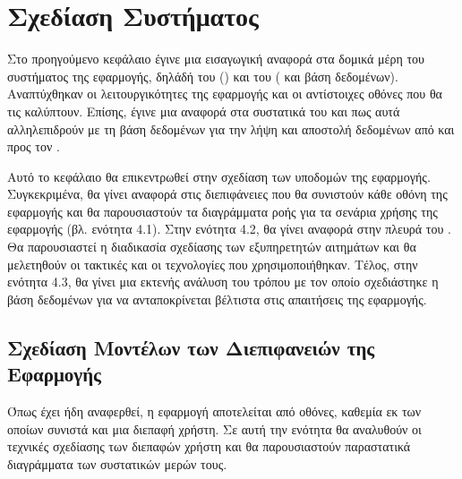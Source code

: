 \chapter{Σχεδίαση Συστήματος}
\label{chap4}

Στο προηγούμενο κεφάλαιο έγινε μια εισαγωγική αναφορά στα δομικά μέρη του συστήματος της εφαρμογής, δηλάδή του  () και του  ( και βάση δεδομένων). Αναπτύχθηκαν οι λειτουργικότητες της εφαρμογής και οι αντίστοιχες οθόνες που θα τις καλύπτουν. Επίσης, έγινε μια αναφορά στα συστατικά του  και πως αυτά αλληλεπιδρούν με τη βάση δεδομένων για την λήψη και αποστολή δεδομένων από και προς τον .

Αυτό το κεφάλαιο θα επικεντρωθεί στην σχεδίαση των υποδομών της εφαρμογής. Συγκεκριμένα, θα γίνει αναφορά στις διεπιφάνειες που θα συνιστούν κάθε οθόνη της εφαρμογής και θα παρουσιαστούν τα διαγράμματα ροής για τα σενάρια χρήσης της εφαρμογής (βλ. ενότητα 4.1). Στην ενότητα 4.2, θα γίνει αναφορά στην πλευρά του . Θα παρουσιαστεί η διαδικασία σχεδίασης των εξυπηρετητών αιτημάτων και θα μελετηθούν οι τακτικές και οι τεχνολογίες που χρησιμοποιήθηκαν. Τέλος, στην ενότητα 4.3, θα γίνει μια εκτενής ανάλυση του τρόπου με τον οποίο σχεδιάστηκε η βάση δεδομένων για να ανταποκρίνεται βέλτιστα στις απαιτήσεις της εφαρμογής.

\section{Σχεδίαση Μοντέλων των Διεπιφανειών της Εφαρμογής}
Όπως έχει ήδη αναφερθεί, η εφαρμογή αποτελείται από οθόνες, καθεμία εκ των οποίων συνιστά και μια διεπαφή χρήστη. Σε αυτή την ενότητα θα αναλυθούν οι τεχνικές σχεδίασης των διεπαφών χρήστη και θα παρουσιαστούν παραστατικά διαγράμματα των συστατικών μερών τους.

